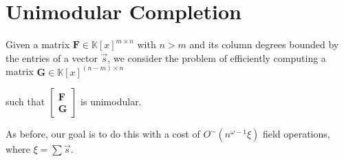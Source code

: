 
\chapter{\label{chap:Unimodular-Completion}Unimodular Completion}

Given a matrix $\mathbf{F}\in\mathbb{K}\left[x\right]^{m\times n}$
with $n>m$ and its column degrees bounded by the entries of a vector
$\vec{s}$, we consider the problem of efficiently computing a matrix
$\mathbf{G}\in\mathbb{K}\left[x\right]^{(n-m)\times n}$ %
\begin{comment}
with $\left(-\vec{s}\right)$-minimal rows 
\end{comment}
such that $\begin{bmatrix}\mathbf{F}\\
\mathbf{G}
\end{bmatrix}$ is unimodular.%
\begin{comment}
let us call the product of the nonzero entries of its smith normal
form the \emph{generalized determinant} of $\mathbf{F}$.

Suppose $\mathbf{F}$ is full-rank with column degrees bounded by
the entries of a shift $\vec{s}\in\mathbb{Z}_{\ge0}^{n}$. We consider
the problem of finding a matrix $\mathbf{G}\in\mathbb{K}\left[x\right]^{(n-m)\times n}$
with $\left(-\vec{s}\right)$-minimal rows such that $\left[\mathbf{F}^{T},\mathbf{G}^{T}\right]^{T}$
has the same determinant as the generalized determinant of $\mathbf{F}$.
In the special case where the generalized determinant of $\mathbf{F}$
is $1$, the problem specializes to the standard unimodular completion
problem, where $\left[\mathbf{F}^{T},\mathbf{G}^{T}\right]^{T}$ is
unimodular. Note that the $\left(-\vec{s}\right)$ shift is chosen
to make the degrees consistent with the degrees of the input matrix
$\mathbf{F}$.
\begin{example}
If $\mathbf{F}=\left[1,0\right]$, $\vec{s}=\left[0,0\right]$. Then
the generalized determinant of $\mathbf{F}$ is $1$. A $\left(-\vec{s}\right)$-minimal
unimodular completion of $\mathbf{F}$ is then $\mathbf{G}=\left[0,1\right]$.
A unimodular completion that is not minimal is $\left[x^{9},1\right]$.
If $\mathbf{F}=\left[x,x^{2}\right]$, then a $\left(-\vec{s}\right)$-minimal
completion that maintains the generalized determinant is again $\left[0,1\right]$.\end{example}
\end{comment}
{} As before, our goal is to do this with a cost of $O^{\sim}\left(n^{\omega-1}\xi\right)$
field operations, where $\xi=\sum\vec{s}$. 

